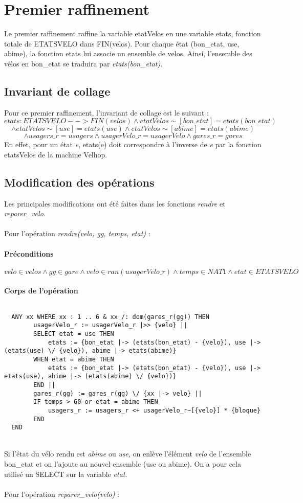\documentclass[12pt]{article}
\begin{document}
\section{Premier raffinement}
Le premier raffinement raffine la variable etatVelos en une variable etats, fonction totale de ETATSVELO dans FIN(velos). Pour chaque état (bon\_etat, use, abime), la fonction etats lui associe un ensemble de velos. Ainsi, l'ensemble des vélos en bon\_etat se traduira par \textit{etats(bon\_etat)}.
\subsection{Invariant de collage}
Pour ce premier raffinement, l'invariant de collage est le suivant : \\
\[ etats : ETATSVELO --> FIN(velos) \land etatVelos\sim[{bon\_etat}] = etats(bon\_etat) \]
\[ \land etatVelos\sim[{use}] = etats(use) \land etatVelos\sim[{abime}] = etats(abime) \]
\[ \land usagers\_r = usagers \land usagerVelo\_r = usagerVelo \land gares\_r = gares \]
En effet, pour un état \textit{e}, etats(e) doit correspondre à l'inverse de \textit{e} par la fonction etatsVelos de la machine Velhop.
\subsection{Modification des opérations}
Les principales modifications ont été faites dans les fonctions \textit{rendre} et \textit{reparer\_velo}. \\ \\
Pour l'opération \textit{rendre(velo, gg, temps, etat)} :
\paragraph{Préconditions}
\[ velo \in velos \land gg \in gare \land velo \in ran(usagerVelo\_r) \land temps \in NAT1 \land etat \in ETATSVELO\]
\paragraph{Corps de l'opération}
\[\]
\begin{lstlisting}
  ANY xx WHERE xx : 1 .. 6 & xx /: dom(gares_r(gg)) THEN
        usagerVelo_r := usagerVelo_r |>> {velo} ||
        SELECT etat = use THEN
            etats := {bon_etat |-> (etats(bon_etat) - {velo}), use |-> (etats(use) \/ {velo}), abime |-> etats(abime)}
        WHEN etat = abime THEN
            etats := {bon_etat |-> (etats(bon_etat) - {velo}), use |-> etats(use), abime |-> (etats(abime) \/ {velo})}
        END ||
        gares_r(gg) := gares_r(gg) \/ {xx |-> velo} ||
        IF temps > 60 or etat = abime THEN
            usagers_r := usagers_r <+ usagerVelo_r~[{velo}] * {bloque}
        END
  END
\end{lstlisting} \\
Si l'état du vélo rendu est \textit{abime} ou \textit{use}, on enlève l'élément \textit{velo} de l'ensemble bon\_etat et on l'ajoute au nouvel ensemble (use ou abime). On a pour cela utilisé un SELECT sur la variable \textit{etat}. \\ \\
Pour l'opération \textit{reparer\_velo(velo)} :
\end{document}
